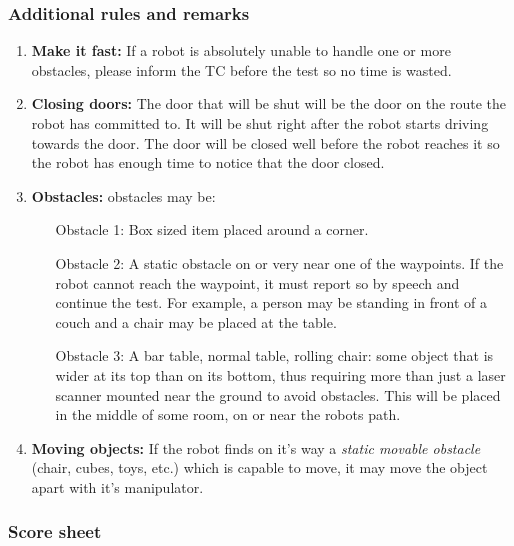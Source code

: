 \subsubsection{Additional rules and remarks}
\begin{enumerate}

\item \textbf{Make it fast:} If a robot is absolutely unable to handle one or more obstacles, please inform the TC before the test so no time is wasted.
\item \textbf{Closing doors:}  The door that will be shut will be the door on the route the robot has committed to. It will be shut right after the robot starts driving towards the door. The door will be closed well before the robot reaches it so the robot has enough time to notice that the door closed.
\item \textbf{Obstacles:} obstacles may be:
\begin{enumerate}
\item [Obstacle 1:] Box sized item placed around a corner. 
\item [Obstacle 2:] A static obstacle on or very near one of the waypoints. If the robot cannot reach the waypoint, it must report so by speech and continue the test. For example, a person may be standing in front of a couch and a chair may be placed at the table. 
\item [Obstacle 3:] A bar table, normal table, rolling chair: some object that is wider at its top than on its bottom, thus requiring more than just a laser scanner mounted near the ground to avoid obstacles. This will be placed in the middle of some room, on or near the robots path.
\end{enumerate}
\item \textbf{Moving objects:} If the robot finds on it's way a \textit{static movable obstacle} (chair, cubes, toys, etc.) which is capable to move, it may move the object apart with it's manipulator.
\end{enumerate}

%

\subsubsection{Score sheet}

